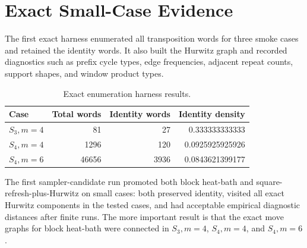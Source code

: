 \section{Exact Small-Case Evidence}

The first exact harness enumerated all transposition words for three smoke
cases and retained the identity words.  It also built the Hurwitz graph and
recorded diagnostics such as prefix cycle types, edge frequencies, adjacent
repeat counts, support shapes, and window product types.

\begin{table}[ht]
\centering
\begin{tabular}{lrrr}
\toprule
Case & Total words & Identity words & Identity density \\
\midrule
$S_3,m=4$ & 81 & 27 & 0.333333333333 \\
$S_4,m=4$ & 1296 & 120 & 0.0925925925926 \\
$S_4,m=6$ & 46656 & 3936 & 0.0843621399177 \\
\bottomrule
\end{tabular}
\caption{Exact enumeration harness results.}
\label{tab:exact-counts}
\end{table}

The first sampler-candidate run promoted both block heat-bath and
square-refresh-plus-Hurwitz on small cases: both preserved identity, visited
all exact Hurwitz components in the tested cases, and had acceptable empirical
diagnostic distances after finite runs.  The more important result is that the
exact move graphs for block heat-bath were connected in
$S_3,m=4$, $S_4,m=4$, and $S_4,m=6$.
